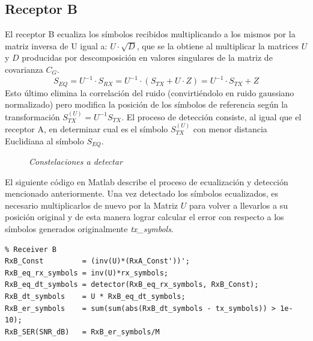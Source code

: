 \documentclass	[12pt,A4paper,titlepage]{article}
\begin{document}
\subsection{Receptor B}
El receptor B ecualiza los símbolos recibidos multiplicando a los mismos por la matriz inversa de U igual a: $U\cdot \sqrt{D}$, que se la obtiene al multiplicar la matrices $U$ y $D$ producidas por descomposición en valores singulares de la matriz de covarianza $C_G$.
\begin{equation}
	S_{EQ} = U^{-1} \cdot S_{RX} = U^{-1} \cdot (S_{TX} + U \cdot Z) = U^{-1} \cdot S_{TX} + Z
\end{equation}
Esto último elimina la correlación del ruido (convirtiéndolo en ruido gaussiano normalizado) pero modifica la posición de los símbolos de referencia según la transformación $S_{TX}^{(U)} = U^{-1}S_{TX}$. El proceso de detección consiste, al igual que el receptor A, en determinar cual es el símbolo $S_{TX}^{(U)}$ con menor distancia Euclidiana al símbolo $S_{EQ}$.
\begin{figure}[H]
	\centering
	\caption{ \textit{Constelaciones a detectar} }
	\label{}
\end{figure}

El siguiente código en Matlab describe el proceso de ecualización y detección mencionado anteriormente. Una vez detectado los símbolos ecualizados, es necesario multiplicarlos de nuevo por la Matriz $U$ para volver a llevarlos a su posición original y de esta manera lograr calcular el error con respecto  a los símbolos generados originalmente \textit{tx\_symbols}.
\begin{verbatim}
% Receiver B
RxB_Const         = (inv(U)*(RxA_Const'))';
RxB_eq_rx_symbols = inv(U)*rx_symbols;
RxB_eq_dt_symbols = detector(RxB_eq_rx_symbols, RxB_Const);
RxB_dt_symbols    = U * RxB_eq_dt_symbols;
RxB_er_symbols    = sum(sum(abs(RxB_dt_symbols - tx_symbols)) > 1e-10);
RxB_SER(SNR_dB)   = RxB_er_symbols/M
\end{verbatim}
\end{document}

